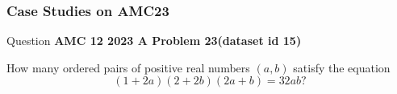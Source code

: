 \subsubsection{Case Studies on AMC23}
\label{supp_sec:amc23_case}


\begin{questionbox}{ Question }
\textbf{AMC 12 2023 A Problem 23(dataset id 15)}\footnotemark

How many ordered pairs of positive real numbers $(a,b)$ satisfy the equation
\[(1+2a)(2+2b)(2a+b) = 32ab?\]

\end{questionbox}


